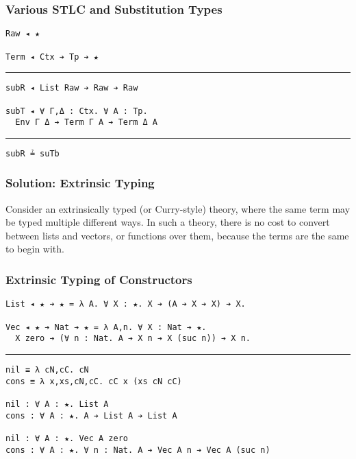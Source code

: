 \documentclass[mathserif,usenames,dvipsnames]{beamer}
\begin{document}
\begin{frame}[fragile]
\frametitle{Various STLC and Substitution Types}

\begin{verbatim}
Raw ◂ ★

Term ◂ Ctx ➔ Tp ➔ ★
\end{verbatim}

\noindent\rule{\textwidth}{1pt}

\begin{verbatim}
subR ◂ List Raw ➔ Raw ➔ Raw

subT ◂ ∀ Γ,Δ : Ctx. ∀ A : Tp.
  Env Γ Δ ➔ Term Γ A ➔ Term Δ A
\end{verbatim}

\noindent\rule{\textwidth}{1pt}

\begin{verbatim}
subR ≟ suTb
\end{verbatim}

\end{frame}

\begin{frame}[fragile]
\frametitle{Solution: Extrinsic Typing}

Consider an extrinsically typed (or Curry-style) theory, where the
same term may be typed multiple different ways. In such a theory,
there is no cost to convert between lists and vectors, or functions
over them, because the terms are the same to begin with.

\end{frame}

\begin{frame}[fragile]
\frametitle{Extrinsic Typing of Constructors}

\begin{verbatim}
List ◂ ★ ➔ ★ = λ A. ∀ X : ★. X ➔ (A ➔ X ➔ X) ➔ X.

Vec ◂ ★ ➔ Nat ➔ ★ = λ A,n. ∀ X : Nat ➔ ★.
  X zero ➔ (∀ n : Nat. A ➔ X n ➔ X (suc n)) ➔ X n.
\end{verbatim}

\noindent\rule{\textwidth}{1pt}

\begin{verbatim}
nil ≡ λ cN,cC. cN
cons ≡ λ x,xs,cN,cC. cC x (xs cN cC)

nil : ∀ A : ★. List A
cons : ∀ A : ★. A ➔ List A ➔ List A

nil : ∀ A : ★. Vec A zero
cons : ∀ A : ★. ∀ n : Nat. A ➔ Vec A n ➔ Vec A (suc n)
\end{verbatim}

\end{frame}
\end{document}
